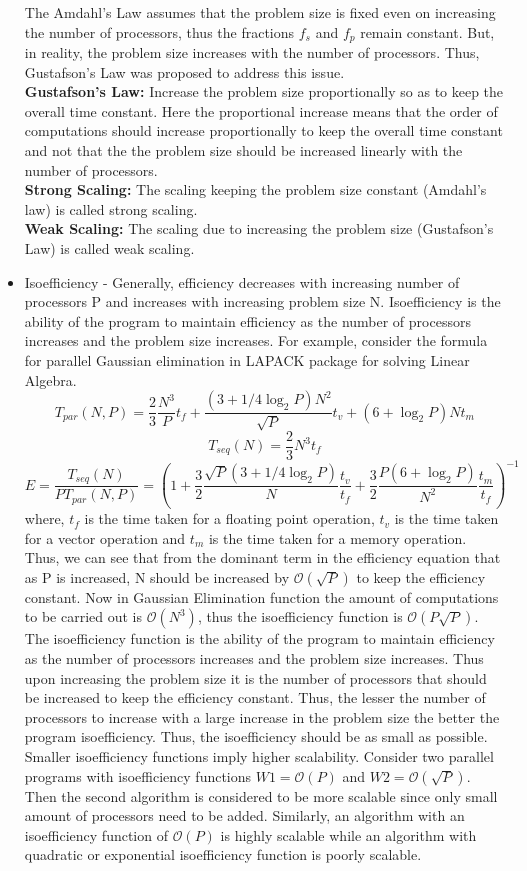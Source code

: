 \documentclass[12pt]{article}
\begin{document}
\begin{itemize}
    The Amdahl's Law assumes that the problem size is fixed even on increasing the number of processors, thus the fractions $f_s$ and $f_p$ remain constant. 
    But, in reality, the problem size increases with the number of processors. Thus, Gustafson's Law was proposed to address this issue.\\
    \textbf{Gustafson's Law: }Increase the problem size proportionally so as to keep the overall time constant. Here the proportional increase means that the order of computations should increase proportionally to keep the overall time constant
    and not that the the problem size should be increased linearly with the number of processors.\\
    \textbf{Strong Scaling: }The scaling keeping the problem size constant (Amdahl's law) is called strong scaling.\\
    \textbf{Weak Scaling: }The scaling due to increasing the problem size (Gustafson's Law) is called weak scaling.
    \item Isoefficiency - Generally, efficiency decreases with increasing number of processors P and increases with increasing problem size N.
    Isoefficiency is the ability of the program to maintain efficiency as the number of processors increases and the problem size increases. For example, consider the formula for parallel Gaussian elimination in 
    LAPACK package for solving Linear Algebra.
    \[T_{par}(N,P)=\frac{2}{3} \frac{N^3}{P} t_f+ \frac{(3+1/4 \log_2 P)N^2}{\sqrt{P}}t_v+(6+ \log_2 P)Nt_m\]
    \[T_{seq}(N)=\frac{2}{3}N^3t_f\]
    \[E=\frac{T_{seq}(N)}{PT_{par}(N,P)}=(1+\frac{3}{2}\frac{\sqrt{P}(3+1/4\log_2 P)}{N}\frac{t_v}{t_f}+\frac{3}{2}\frac{P(6+\log_2 P)}{N^2}\frac{t_m}{t_f})^{-1}\]
    where, $t_f$ is the time taken for a floating point operation, $t_v$ is the time taken for a vector operation and $t_m$ is the time taken for a memory operation.
    Thus, we can see that from the dominant term in the efficiency equation that as P is increased, N should be increased by $\mathcal{O}(\sqrt{P})$ to keep the efficiency constant.
    Now in Gaussian Elimination function the amount of computations to be carried out is $\mathcal{O}(N^3)$, thus the isoefficiency function is $\mathcal{O}(P\sqrt{P})$. 
    The isoefficiency function is the ability of the program to maintain efficiency as the number of processors increases and the problem size increases. Thus upon increasing the problem size it is
    the number of processors that should be increased to keep the efficiency constant. Thus, the lesser the number of processors to increase with a large increase in the problem size the better the program isoefficiency.
    Thus, the isoefficiency should be as small as possible. Smaller isoefficiency functions imply higher scalability. Consider two parallel programs with isoefficiency functions $W1=\mathcal{O}(P)$ 
    and $W2=\mathcal{O}(\sqrt{P})$. Then the second algorithm is considered to be more scalable since only small amount of processors need to be added. Similarly, an algorithm with an isoefficiency 
    function of $\mathcal{O}(P)$ is highly scalable while an algorithm with quadratic or exponential isoefficiency function is poorly scalable.
\end{itemize}
\end{document}
